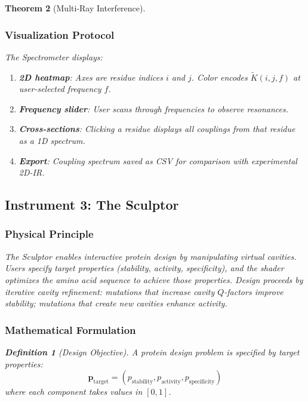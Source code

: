 \documentclass[11pt,a4paper]{article}
\newtheorem{theorem}{Theorem}[section]
\newtheorem{definition}[theorem]{Definition}
\begin{document}
\begin{theorem}[Multi-Ray Interference]
\subsubsection{Visualization Protocol}

The Spectrometer displays:
\begin{enumerate}
\item \textbf{2D heatmap}: Axes are residue indices $i$ and $j$. Color encodes $\tilde{K}(i,j,f)$ at user-selected frequency $f$.
\item \textbf{Frequency slider}: User scans through frequencies to observe resonances.
\item \textbf{Cross-sections}: Clicking a residue displays all couplings from that residue as a 1D spectrum.
\item \textbf{Export}: Coupling spectrum saved as CSV for comparison with experimental 2D-IR.
\end{enumerate}

\subsection{Instrument 3: The Sculptor}

\subsubsection{Physical Principle}

The Sculptor enables interactive protein design by manipulating virtual cavities. Users specify target properties (stability, activity, specificity), and the shader optimizes the amino acid sequence to achieve those properties. Design proceeds by iterative cavity refinement: mutations that increase cavity $Q$-factors improve stability; mutations that create new cavities enhance activity.

\subsubsection{Mathematical Formulation}

\begin{definition}[Design Objective]
A protein design problem is specified by target properties:
\begin{equation}
\mathbf{p}_{\text{target}} = (p_{\text{stability}}, p_{\text{activity}}, p_{\text{specificity}})
\end{equation}
where each component takes values in $[0,1]$.
\end{definition}


\end{theorem}
\end{document}
